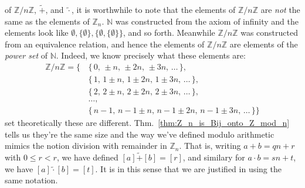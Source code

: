 \documentclass{article}                                                        %
\begin{document}
            of $\mathbb{Z}/n\mathbb{Z}$, $\tilde{+}$, and $\tilde{\cdot}$, it is
            worthwhile to note that the elements of $\mathbb{Z}/n\mathbb{Z}$ are
            \textit{not} the same as the elements of $\mathbb{Z}_{n}$.
            $\mathbb{N}$ was constructed from the axiom of infinity and the
            elements look like
            $\emptyset,\{\emptyset\},\{\emptyset,\{\emptyset\}\}$, and so forth.
            Meanwhile $\mathbb{Z}/n\mathbb{Z}$ was constructed from an
            equivalence relation, and hence the elements of
            $\mathbb{Z}/n\mathbb{Z}$ are elements of the \textit{power set} of
            $\mathbb{N}$. Indeed, we know precisely what these elements are:
            \begin{equation}
                \begin{split}
                    \mathbb{Z}/n\mathbb{Z}=
                    \Big\{\,&\{\,0,\,\pm{n},\,\pm{2n},\,\pm{3n},\,\dots\,\},\\
                        &\{\,1,\,1\pm{n},\,1\pm{2n},\,1\pm{3n},\,\dots\,\},\\
                        &\{\,2,\,2\pm{n},\,2\pm{2n},\,2\pm{3n},\,\dots\,\},\\
                        &\dots,\\
                        &\{\,n-1,\,n-1\pm{n},\,n-1\pm{2n},\,n-1\pm{3n},\,
                            \dots\,\}\Big\}
                \end{split}
            \end{equation}
            set theoretically these are different.
            Thm.~\ref{thm:Z_n_is_Bij_onto_Z_mod_n} tells us they're the same
            size and the way we've defined modulo arithmetic mimics the notion
            division with remainder in $\mathbb{Z}_{n}$. That is,
            writing $a+b=qn+r$ with $0\leq{r}<r$, we have defined
            $[a]\tilde{+}[b]=[r]$, and similary for $a\cdot{b}=sn+t$, we have
            $[a]\tilde{\cdot}[b]=[t]$. It is in this sense that we are justified
            in using the same notation.
\end{document}
